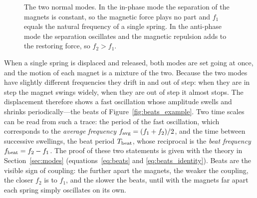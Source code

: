 \begin{figure}[htbp]
\centering
{}
\caption{The two normal modes. In the in-phase mode the separation of the magnets is constant, so the magnetic force plays no part and $f_1$ equals the natural frequency of a single spring. In the anti-phase mode the separation oscillates and the magnetic repulsion adds to the restoring force, so $f_2>f_1$.}
\label{fig:modes_sketch}
\end{figure}

When a single spring is displaced and released, both modes are set going at once, and the motion of each magnet is a mixture of the two. Because the two modes have slightly different frequencies they drift in and out of step: when they are in step the magnet swings widely, when they are out of step it almost stops. The displacement therefore shows a fast oscillation whose amplitude swells and shrinks periodically---the beats of Figure~\ref{fig:beats_example}. Two time scales can be read from such a trace: the period of the fast oscillation, which corresponds to the \emph{average frequency} $f_{\rm avg}=(f_1+f_2)/2$, and the time between successive swellings, the beat period $T_{\rm beat}$, whose reciprocal is the \emph{beat frequency} $f_{\rm beat}=f_2-f_1$. The proof of these two statements is given with the theory in Section~\ref{sec:modes} (equations~\eqref{eq:beats} and \eqref{eq:beats_identity}). Beats are the visible sign of coupling: the further apart the magnets, the weaker the coupling, the closer $f_2$ is to $f_1$, and the slower the beats, until with the magnets far apart each spring simply oscillates on its own.

